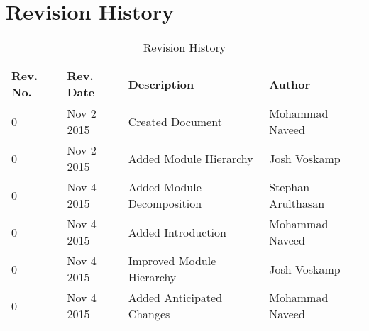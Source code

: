 \documentclass[12pt]{article}
\begin{document}
\newpage
\tableofcontents
\newpage
\listoftables
{}
\newpage
\listoffigures
{}
\newpage

\section*{Revision History}
\begin{table}[!htbp]
	\centering
	\begin{tabular}{ | p{2cm} | p{2cm}| p{6cm} | p{4cm}|}
		\hline
		Rev. No. & Rev. Date & Description & Author \\\hline
		0 & Nov 2 2015 & Created Document & Mohammad Naveed \\\hline
		0 & Nov 2 2015 & Added Module Hierarchy & Josh Voskamp \\\hline
		0 & Nov 4 2015 & Added Module Decomposition & Stephan Arulthasan\\\hline
		0 & Nov 4 2015 & Added Introduction & Mohammad Naveed \\\hline
		0 & Nov 4 2015 & Improved Module Hierarchy & Josh Voskamp \\\hline
		0 & Nov 4 2015 & Added Anticipated Changes & Mohammad Naveed \\\hline
		
	\end{tabular}
	\caption{Revision History}
\end{table}
\newpage
\end{document}

